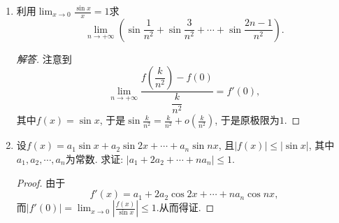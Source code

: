 \begin{1a}
\begin{enumerate}
试计算\(f_{\boldsymbol{x}},\nabla f\).
\begin{proof}[解答]
\(\nabla f=(f_{\boldsymbol{x}})^\mathrm{T}=[\boldsymbol{A}(x_{m+1},\cdots,x_{n});\boldsymbol{A}^\mathrm{T}(x_1,\cdots,x_m)]\).
\end{proof}
\item 利用\(\lim_{x\rightarrow 0}\frac{\sin x}{x}=1\)求
\[\lim_{n\rightarrow+\infty}\left(\sin\frac{1}{n^2}+\sin\frac{3}{n^2}+\cdots+\sin\frac{2n-1}{n^2}\right).\]
\begin{proof}[解答]
注意到\[\lim_{n\rightarrow+\infty}\frac{f\left(\dfrac{k}{n^2}\right)-f(0)}{\dfrac{k}{n^2}}=f'(0),\]
其中\(f(x)=\sin x\), 于是\(\sin\frac{k}{n^2}=\frac{k}{n^2}+o\left(\frac{k}{n^2}\right)\), 于是原极限为\(1\).
\end{proof}
\item 设\(f(x)=a_1\sin x+a_2\sin 2x+\cdots+a_n\sin nx\), 
且\(|f(x)|\leqslant|\sin x|\), 其中\(a_1,a_2,\cdots,a_n\)为常数. 
求证: \(|a_1+2a_2+\cdots+na_n|\leqslant 1\).
\begin{proof}
由于\[f'(x)=a_1+2a_2\cos 2x+\cdots+na_n\cos nx,\]
而\(|f'(0)|=\lim_{x\rightarrow 0}\left|\frac{f(x)}{\sin x}\right|\leqslant 1.\)从而得证.
\end{proof}
\end{enumerate}
\end{1a}
